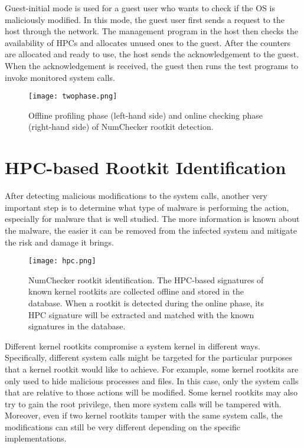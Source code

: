 \documentclass[12pt]{report}
\begin{document}
Guest-initial mode is used for a guest user who wants to
check if the OS is maliciously modified. In this mode, the guest
user first sends a request to the host through the network. The
management program in the host then checks the availability
of HPCs and allocates unused ones to the guest. After the
counters are allocated and ready to use, the host sends the
acknowledgement to the guest. When the acknowledgement
is received, the guest then runs the test programs to invoke
monitored system calls.

\begin{figure}[h]
\centering
\texttt{[image: twophase.png]}
\caption{Offline profiling phase (left-hand side) and online checking
phase (right-hand side) of NumChecker rootkit detection.}
\end{figure}

\section{HPC-based Rootkit Identification}
After detecting malicious modifications to the system calls,
another very important step is to determine what type of
malware is performing the action, especially for malware that
is well studied. The more information is known about the
malware, the easier it can be removed from the infected system
and mitigate the risk and damage it brings.

\begin{figure}[h]
\centering
\texttt{[image: hpc.png]}
\caption{NumChecker rootkit identification. The HPC-based signatures
of known kernel rootkits are collected offline and stored in the
database. When a rootkit is detected during the online phase, its HPC
signature will be extracted and matched with the known signatures
in the database.}
\end{figure}

Different kernel rootkits compromise a system kernel in
different ways. Specifically, different system calls might be
targeted for the particular purposes that a kernel rootkit would
like to achieve. For example, some kernel rootkits are only
used to hide malicious processes and files. In this case, only the
system calls that are relative to those actions will be modified.
Some kernel rootkits may also try to gain the root privilege,
then more system calls will be tampered with. Moreover, even
if two kernel rootkits tamper with the same system calls,
the modifications can still be very different depending on the
specific implementations.
\end{document}
